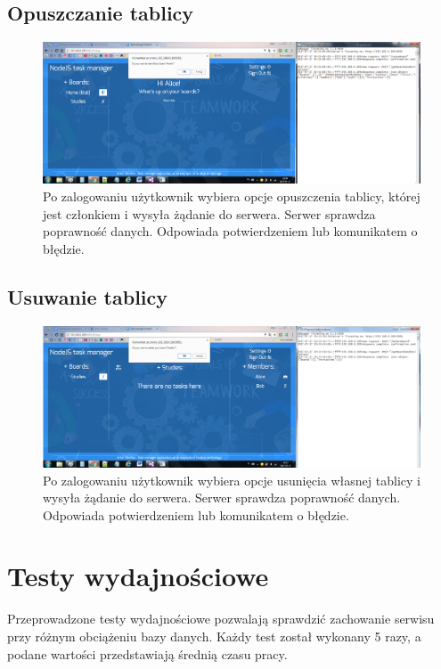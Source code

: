 \documentclass[12pt]{report}
\begin{document}
\subsection{Opuszczanie tablicy}
\begin{figure}[!hb]
\centering
\includegraphics[width=\textwidth,height=\textheight,keepaspectratio]{D2.png}
\captionsetup{labelformat=empty}
\caption[]{Po zalogowaniu użytkownik wybiera opcje opuszczenia tablicy, której jest członkiem i wysyła żądanie do serwera. 
Serwer sprawdza poprawność danych. Odpowiada potwierdzeniem lub komunikatem o błędzie.}
\end{figure}

\subsection{Usuwanie tablicy}
\begin{figure}[!hb]
\centering
\includegraphics[width=\textwidth,height=\textheight,keepaspectratio]{E2.png}
\captionsetup{labelformat=empty}
\caption[]{Po zalogowaniu użytkownik wybiera opcje usunięcia własnej tablicy i wysyła żądanie do serwera. Serwer sprawdza poprawność danych. Odpowiada potwierdzeniem lub komunikatem o błędzie.}
\end{figure}

\section{Testy wydajnościowe}
Przeprowadzone testy wydajnościowe pozwalają sprawdzić zachowanie serwisu przy różnym obciążeniu bazy danych. Każdy test został wykonany 5 razy, a podane wartości przedstawiają średnią czasu pracy.
\end{document}
